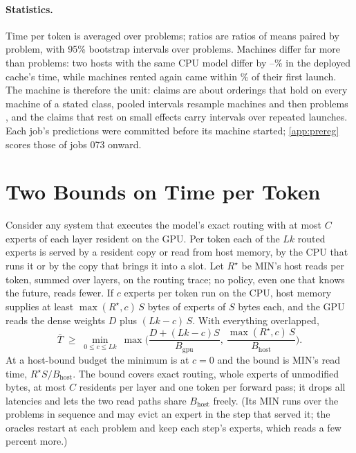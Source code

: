 

\paragraph{Statistics.} Time per token is averaged over problems; ratios are ratios of means paired by problem, with
95\% bootstrap intervals over problems. Machines differ far more than problems: two hosts with the same CPU model
differ by \pnSameCpuDiffMin--\pnSameCpuDiffMax\% in the deployed cache's time, while machines rented again came within
\jcRelaunchBaseMax\% of their first launch. The machine is therefore the unit: claims are about orderings that hold on
every machine of a stated class, pooled intervals resample machines and then problems \citep{kalibera2013rigorous}, and
the claims that rest on small effects carry intervals over repeated launches. Each job's predictions were committed
before its machine started; \cref{app:prereg} scores those of jobs 073 onward.

\section{Two Bounds on Time per Token}\label{sec:limit}
Consider any system that executes the model's exact routing with at most $C$ experts of each layer resident on the
GPU. Per token each of the $Lk$ routed experts is served by a resident copy or read from host memory, by the CPU that
runs it or by the copy that brings it into a slot. Let $R^\star$ be MIN's host reads per token, summed over layers, on
the routing trace; no policy, even one that knows the future, reads fewer. If $c$ experts per token run on the CPU,
host memory supplies at least $\max(R^\star,c)\,S$ bytes of experts of $S$ bytes each, and the GPU reads the dense
weights $D$ plus $(Lk-c)\,S$. With everything overlapped,
\begin{equation}
\bar T \;\ge\; \min_{0\le c\le Lk}\ \max\!\Big(\frac{D+(Lk-c)S}{B_{\mathrm{gpu}}},\ \frac{\max(R^\star\!,c)\,S}{B_{\mathrm{host}}}\Big).
\label{eq:limit}
\end{equation}
At a host-bound budget the minimum is at $c{=}0$ and the bound is MIN's read time, $R^\star S/B_{\mathrm{host}}$. The
bound covers exact routing, whole experts of unmodified bytes, at most $C$ residents per layer and one token per
forward pass; it drops all latencies and lets the two read paths share $B_{\mathrm{host}}$ freely. (Its MIN runs over
the problems in sequence and may evict an expert in the step that served it; the oracles restart at each problem and
keep each step's experts, which reads a few percent more.)

